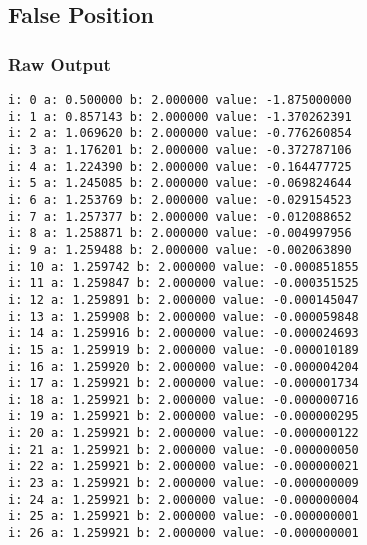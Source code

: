 \documentclass[11pt]{article} %
\begin{document}
\subsection*{False Position}
\subsubsection*{Raw Output}
\begin{verbatim}
i: 0 a: 0.500000 b: 2.000000 value: -1.875000000 
i: 1 a: 0.857143 b: 2.000000 value: -1.370262391 
i: 2 a: 1.069620 b: 2.000000 value: -0.776260854 
i: 3 a: 1.176201 b: 2.000000 value: -0.372787106 
i: 4 a: 1.224390 b: 2.000000 value: -0.164477725 
i: 5 a: 1.245085 b: 2.000000 value: -0.069824644 
i: 6 a: 1.253769 b: 2.000000 value: -0.029154523 
i: 7 a: 1.257377 b: 2.000000 value: -0.012088652 
i: 8 a: 1.258871 b: 2.000000 value: -0.004997956 
i: 9 a: 1.259488 b: 2.000000 value: -0.002063890 
i: 10 a: 1.259742 b: 2.000000 value: -0.000851855 
i: 11 a: 1.259847 b: 2.000000 value: -0.000351525 
i: 12 a: 1.259891 b: 2.000000 value: -0.000145047 
i: 13 a: 1.259908 b: 2.000000 value: -0.000059848 
i: 14 a: 1.259916 b: 2.000000 value: -0.000024693 
i: 15 a: 1.259919 b: 2.000000 value: -0.000010189 
i: 16 a: 1.259920 b: 2.000000 value: -0.000004204 
i: 17 a: 1.259921 b: 2.000000 value: -0.000001734 
i: 18 a: 1.259921 b: 2.000000 value: -0.000000716 
i: 19 a: 1.259921 b: 2.000000 value: -0.000000295 
i: 20 a: 1.259921 b: 2.000000 value: -0.000000122 
i: 21 a: 1.259921 b: 2.000000 value: -0.000000050 
i: 22 a: 1.259921 b: 2.000000 value: -0.000000021 
i: 23 a: 1.259921 b: 2.000000 value: -0.000000009 
i: 24 a: 1.259921 b: 2.000000 value: -0.000000004 
i: 25 a: 1.259921 b: 2.000000 value: -0.000000001 
i: 26 a: 1.259921 b: 2.000000 value: -0.000000001 
\end{verbatim}
\end{document}

